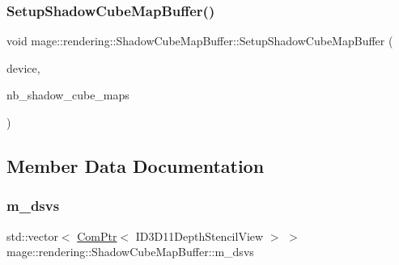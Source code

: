 \hypertarget{classmage_1_1rendering_1_1_shadow_cube_map_buffer_a4b6e895628905a9ddbaccfafb6a1d5b6}{}\label{classmage_1_1rendering_1_1_shadow_cube_map_buffer_a4b6e895628905a9ddbaccfafb6a1d5b6} 
\subsubsection{\texorpdfstring{Setup\+Shadow\+Cube\+Map\+Buffer()}{SetupShadowCubeMapBuffer()}}
{\footnotesize\ttfamily void mage\+::rendering\+::\+Shadow\+Cube\+Map\+Buffer\+::\+Setup\+Shadow\+Cube\+Map\+Buffer (\begin{DoxyParamCaption}\item[{I\+D3\+D11\+Device \&}]{device,  }\item[{size\+\_\+t}]{nb\+\_\+shadow\+\_\+cube\+\_\+maps }\end{DoxyParamCaption})\hspace{0.3cm}{\ttfamily [private]}}



\subsection{Member Data Documentation}
\hypertarget{classmage_1_1rendering_1_1_shadow_cube_map_buffer_a939704f906cac1319b261c4c87cb535e}{}\label{classmage_1_1rendering_1_1_shadow_cube_map_buffer_a939704f906cac1319b261c4c87cb535e} 
\subsubsection{\texorpdfstring{m\+\_\+dsvs}{m\_dsvs}}
{\footnotesize\ttfamily std\+::vector$<$ \hyperlink{namespacemage_ae74f374780900893caa5555d1031fd79}{Com\+Ptr}$<$ I\+D3\+D11\+Depth\+Stencil\+View $>$ $>$ mage\+::rendering\+::\+Shadow\+Cube\+Map\+Buffer\+::m\+\_\+dsvs\hspace{0.3cm}{\ttfamily [private]}}

\hypertarget{classmage_1_1rendering_1_1_shadow_cube_map_buffer_a008b52aa40f583dff87df47a97e6ef67}{}\label{classmage_1_1rendering_1_1_shadow_cube_map_buffer_a008b52aa40f583dff87df47a97e6ef67} 
